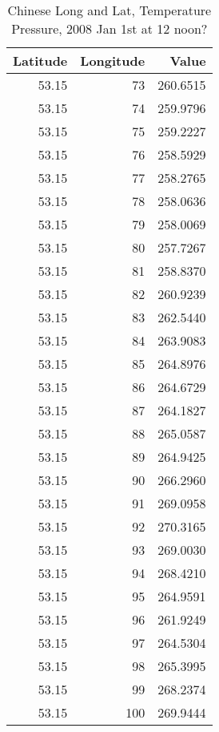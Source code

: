 \documentclass[
]{book}
\begin{document}
\begin{table}[!h]

\caption{\label{tab:unnamed-chunk-22}Chinese Long and Lat, Temperature Pressure, 2008 Jan 1st at 12 noon?}
\centering
\begin{tabular}[t]{r|r|r}
\hline
Latitude & Longitude & Value\\
\hline
\rowcolor{gray!6}  53.15 & 73 & 260.6515\\
\hline
53.15 & 74 & 259.9796\\
\hline
\rowcolor{gray!6}  53.15 & 75 & 259.2227\\
\hline
53.15 & 76 & 258.5929\\
\hline
\rowcolor{gray!6}  53.15 & 77 & 258.2765\\
\hline
53.15 & 78 & 258.0636\\
\hline
\rowcolor{gray!6}  53.15 & 79 & 258.0069\\
\hline
53.15 & 80 & 257.7267\\
\hline
\rowcolor{gray!6}  53.15 & 81 & 258.8370\\
\hline
53.15 & 82 & 260.9239\\
\hline
\rowcolor{gray!6}  53.15 & 83 & 262.5440\\
\hline
53.15 & 84 & 263.9083\\
\hline
\rowcolor{gray!6}  53.15 & 85 & 264.8976\\
\hline
53.15 & 86 & 264.6729\\
\hline
\rowcolor{gray!6}  53.15 & 87 & 264.1827\\
\hline
53.15 & 88 & 265.0587\\
\hline
\rowcolor{gray!6}  53.15 & 89 & 264.9425\\
\hline
53.15 & 90 & 266.2960\\
\hline
\rowcolor{gray!6}  53.15 & 91 & 269.0958\\
\hline
53.15 & 92 & 270.3165\\
\hline
\rowcolor{gray!6}  53.15 & 93 & 269.0030\\
\hline
53.15 & 94 & 268.4210\\
\hline
\rowcolor{gray!6}  53.15 & 95 & 264.9591\\
\hline
53.15 & 96 & 261.9249\\
\hline
\rowcolor{gray!6}  53.15 & 97 & 264.5304\\
\hline
53.15 & 98 & 265.3995\\
\hline
\rowcolor{gray!6}  53.15 & 99 & 268.2374\\
\hline
53.15 & 100 & 269.9444\\

\end{tabular}
\end{table}
\end{document}
